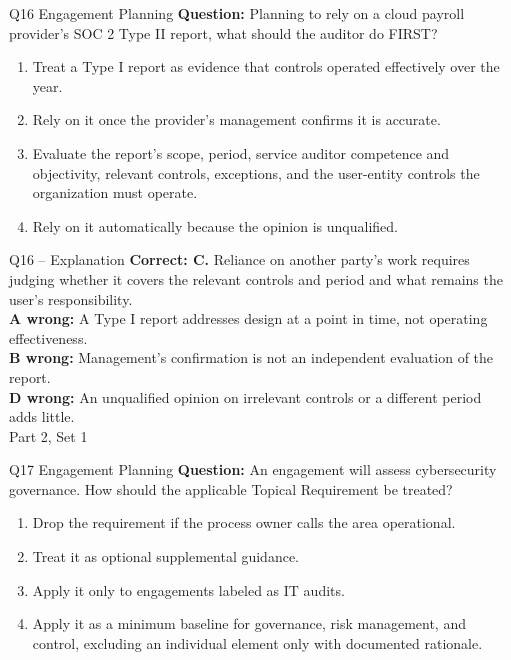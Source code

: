 \documentclass[aspectratio=169,10pt]{beamer}
\begin{document}
\begin{frame}[t]{Q16 \hfill {\scriptsize Engagement Planning}}
	\small
	\textbf{Question:} Planning to rely on a cloud payroll provider's SOC 2 Type II report, what should the auditor do FIRST?
	\begin{enumerate}[label=\Alph*.,itemsep=1pt,topsep=3pt]
			\item Treat a Type I report as evidence that controls operated effectively over the year.
			\item Rely on it once the provider's management confirms it is accurate.
			\item Evaluate the report's scope, period, service auditor competence and objectivity, relevant controls, exceptions, and the user-entity controls the organization must operate.
			\item Rely on it automatically because the opinion is unqualified.
	\end{enumerate}
\end{frame}
\begin{frame}[t]{Q16 -- Explanation}
	\footnotesize
	\textbf{Correct: C.} Reliance on another party's work requires judging whether it covers the relevant controls and period and what remains the user's responsibility. \\[5pt]
\textbf{A wrong:} A Type I report addresses design at a point in time, not operating effectiveness. \\[3pt]
\textbf{B wrong:} Management's confirmation is not an independent evaluation of the report. \\[3pt]
\textbf{D wrong:} An unqualified opinion on irrelevant controls or a different period adds little. \\[3pt]
	\vfill {\tiny Part 2, Set 1}
\end{frame}
\begin{frame}[t]{Q17 \hfill {\scriptsize Engagement Planning}}
	\small
	\textbf{Question:} An engagement will assess cybersecurity governance. How should the applicable Topical Requirement be treated?
	\begin{enumerate}[label=\Alph*.,itemsep=1pt,topsep=3pt]
			\item Drop the requirement if the process owner calls the area operational.
			\item Treat it as optional supplemental guidance.
			\item Apply it only to engagements labeled as IT audits.
			\item Apply it as a minimum baseline for governance, risk management, and control, excluding an individual element only with documented rationale.
	\end{enumerate}
\end{frame}
\end{document}
